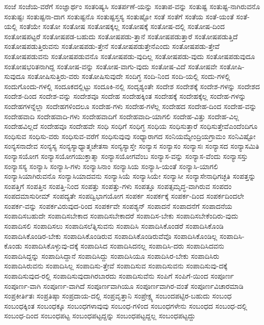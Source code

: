 {ಸಂಜೆ
ಸಂಜೆಯ-ವರೆಗೆ
ಸಂಜ್ಞಾರ್ಥಂ
ಸಂತರಿಷ್ಯಸಿ
ಸಂತರ್ಪಣೆ-ಯನ್ನು
ಸಂತಾಪ-ವನ್ನು
ಸಂತುಷ್ಟ
ಸಂತುಷ್ಟ-ನಾಗಿರುವನೊ
ಸಂತುಷ್ಟಃ
ಸಂತುಷ್ಟನಾ-ದಾಗ
ಸಂತುಷ್ಟನೊ
ಸಂತುಷ್ಟಸ್ತಸ್ಯ
ಸಂತುಷ್ಟೋ
ಸಂತೆ
ಸಂತೆಗೆ
ಸಂತೆಯ
ಸಂತೆ-ಯಂತೆ
ಸಂತೆ-ಯಲ್ಲಿ
ಸಂತೆಯೇ
ಸಂತೋ
ಸಂತೋಷ
ಸಂತೋಷಕ್ಕಲ್ಲ
ಸಂತೋಷಕ್ಕೆ
ಸಂತೋಷ-ದಲ್ಲಿ
ಸಂತೋಷ-ದಿಂದ
ಸಂತೋಷಪಟ್ಟರೆ
ಸಂತೋಷಪಡ-ಬಹುದು
ಸಂತೋಷಪಡು-ತ್ತಾನೆ
ಸಂತೋಷಪಡುತ್ತಾರೆ
ಸಂತೋಷಪಡುತ್ತಿದೆ
ಸಂತೋಷಪಡುತ್ತಿರುವನು
ಸಂತೋಷಪಡು-ತ್ತೇನೆ
ಸಂತೋಷಪಡುತ್ತೇನೆಎಂದು
ಸಂತೋಷಪಡು-ತ್ತೇವೆ
ಸಂತೋಷಪಡುವನು
ಸಂತೋಷಪಡುವನೊ
ಸಂತೋಷಪಡು-ವುದಿಲ್ಲ
ಸಂತೋಷಪಡು-ವುದು
ಸಂತೋಷಪಡುವುದೂ
ಸಂತೋಷಭರಿತನಾಗಿದ್ದ
ಸಂತೋಷ-ವನ್ನು
ಸಂತೋಷ-ವಾಗು-ವುದು
ಸಂತೋಷ-ವಿದೆ
ಸಂತೋಷವೇ
ಸಂತೋಷಿ-ಸುವುದೂ
ಸಂತೋಷಿಸುತ್ತಿರು-ವರು
ಸಂತೋಷಿಸುವುದೇ
ಸಂದಿಗ್ಧ
ಸಂದಿ-ನಿಂದ
ಸಂದಿ-ಯಲ್ಲಿ
ಸಂದು-ಗಳಲ್ಲಿ
ಸಂದುಗೊಂದು-ಗಳಲ್ಲಿ
ಸಂದೂಕದಲ್ಲಿಟ್ಟು
ಸಂದೂಕಿ-ನಲ್ಲಿ
ಸಂದೃಶ್ಯಂತೇ
ಸಂದೇಶ
ಸಂದೇಶಕ್ಕೆ
ಸಂದೇಶ-ಗಳನ್ನು
ಸಂದೇಶದ
ಸಂದೇಶ-ದಿಂದ
ಸಂದೇಶ-ವನ್ನು
ಸಂದೇಶವೂ
ಸಂದೇಹ
ಸಂದೇಹಕ್ಕಿಂತ
ಸಂದೇಹಕ್ಕೆ
ಸಂದೇಹಕ್ಕೆಲ್ಲ
ಸಂದೇಹ-ಗಳನ್ನು
ಸಂದೇಹಗಳನ್ನೆಲ್ಲಾ
ಸಂದೇಹಗಳಿಂದಲೂ
ಸಂದೇಹ-ಗಳು
ಸಂದೇಹ-ಗಳೆಲ್ಲ
ಸಂದೇಹದ
ಸಂದೇಹ-ದಿಂದ
ಸಂದೇಹ-ವನ್ನು
ಸಂದೇಹವಾದಿ
ಸಂದೇಹವಾದಿ-ಗಳು
ಸಂದೇಹವಾದಿಗೆ
ಸಂದೇಹವಾದಿ-ಯಾಗಲಿ
ಸಂದೇಹ-ವಿತ್ತು
ಸಂದೇಹ-ವಿಲ್ಲ
ಸಂದೇಹವಿಲ್ಲದೆ
ಸಂದೇಹವೂ
ಸಂದೇಹವೇ
ಸಂಧಿ
ಸಂಧಿಗೆ
ಸಂಧಿಗ್ಧ
ಸಂಧಿಯ
ಸಂಧಿಸುತ್ತಾರೆ
ಸಂಧಿಸುತ್ತೇವೆಎಂದೆಂದಿಗೂ
ಸಂಧಿಸುವ
ಸಂಧಿಸು-ವರು
ಸಂಧಿಸುವ-ವರೆಗೆ
ಸಂಧಿಸುವುವು
ಸಂಧ್ಯಾರಾಗದ
ಸಂನಿಯಮ್ಯೇಂದ್ರಿಯಗ್ರಾಮಂ
ಸಂನಿವಿಷ್ಟೋ
ಸಂನ್ಯಸನಾದೇವ
ಸಂನ್ಯಸ್ಯ
ಸಂನ್ಯಸ್ಯಾಧ್ಯಾತ್ಮಚೇತಸಾ
ಸಂನ್ಯಸ್ಯಾಸ್ತೇ
ಸಂನ್ಯಾಸ
ಸಂನ್ಯಾಸಂ
ಸಂನ್ಯಾಸಃ
ಸಂನ್ಯಾಸದ
ಸಂನ್ಯಾಸಮಿತಿ
ಸಂನ್ಯಾಸಯೋಗ
ಸಂನ್ಯಾಸಯೋಗಯುಕ್ತಾತ್ಮಾ
ಸಂನ್ಯಾಸಯೋಗವೆಂಬ
ಸಂನ್ಯಾಸ-ವನ್ನು
ಸಂನ್ಯಾಸ-ವೆಂದು
ಸಂನ್ಯಾಸಸ್ತು
ಸಂನ್ಯಾಸಸ್ಯ
ಸಂನ್ಯಾಸಿ
ಸಂನ್ಯಾಸಿ-ಗಳು
ಸಂನ್ಯಾಸಿನಾಂ
ಸಂನ್ಯಾಸಿಯ
ಸಂನ್ಯಾಸಿ-ಯಂತೆ
ಸಂನ್ಯಾಸಿ-ಯಾಗಲಿ
ಸಂನ್ಯಾಸಿಯಾಗಿರುವನೊ
ಸಂನ್ಯಾಸಿಯಾದವನು
ಸಂನ್ಯಾಸಿಯೆ
ಸಂನ್ಯಾಸಿಯೇ
ಸಂನ್ಯಾಸೀ
ಸಂನ್ಯಾಸೇನಾಧಿಗಚ್ಛತಿ
ಸಂಪತ್ತನ್ನು
ಸಂಪತ್ತಿಗೆ
ಸಂಪತ್ತಿನ
ಸಂಪತ್ತಿ-ನಿಂದ
ಸಂಪತ್ತು
ಸಂಪತ್ತು-ಗಳು
ಸಂಪತ್ತೂ
ಸಂಪತ್ಸಮೃದ್ಧ-ವಾಗಿರುವ
ಸಂಪದಂ
ಸಂಪದಮಾಸುರೀಮ್
ಸಂಪದ್ಯತೇ
ಸಂಪದ್ವಿಭಾಗಯೋಗ
ಸಂಪರ್ಕ
ಸಂಪರ್ಕಕ್ಕೆ
ಸಂಪರ್ಕ-ದಿಂದ
ಸಂಪರ್ಕದಿಂದಲೇ
ಸಂಪರ್ಕ-ವನ್ನು
ಸಂಪರ್ಕವಿರುವುದ-ರಿಂದ
ಸಂಪರ್ಕವೇ
ಸಂಪಶ್ಯನ್
ಸಂಪಾದನೆ
ಸಂಪಾದನೆಗೆ
ಸಂಪಾದನೆಯ
ಸಂಪಾದಿಸಬಹುದೇ
ಸಂಪಾದಿಸಬೇಕಾದ
ಸಂಪಾದಿಸಬೇಕಾದರೆ
ಸಂಪಾದಿಸ-ಬೇಕು
ಸಂಪಾದಿಸಬೇಕೆಂದಿರು-ವುದು
ಸಂಪಾದಿಸಲಿ
ಸಂಪಾದಿಸಲು
ಸಂಪಾದಿಸಲೆತ್ನಿಸುವನು
ಸಂಪಾದಿಸಿ
ಸಂಪಾದಿಸಿಕೊಂಡರೆ
ಸಂಪಾದಿಸಿಕೊಂಡಿ
ಸಂಪಾದಿಸಿಕೊಂಡಿರ-ಬೇಕು
ಸಂಪಾದಿಸಿಕೊಂಡಿರುವ
ಸಂಪಾದಿಸಿಕೊಂಡಿರುವೆವೊ
ಸಂಪಾದಿಸಿಕೊಂಡಿಲ್ಲ
ಸಂಪಾದಿಸಿ-ಕೊಂಡು
ಸಂಪಾದಿಸಿಕೊಳ್ಳುವು-ದಕ್ಕೆ
ಸಂಪಾದಿಸಿದ
ಸಂಪಾದಿಸಿದನಲ್ಲ
ಸಂಪಾದಿಸಿ-ದರು
ಸಂಪಾದಿಸಿದವನು
ಸಂಪಾದಿಸಿದ್ದನ್ನು
ಸಂಪಾದಿಸಿದ್ದಾನೆ
ಸಂಪಾದಿಸಿದ್ದು
ಸಂಪಾದಿಸಿಯೂ
ಸಂಪಾದಿಸಿರ-ಬೇಕು
ಸಂಪಾದಿಸಿರು
ಸಂಪಾದಿಸಿರುವನು
ಸಂಪಾದಿಸಿಲ್ಲ
ಸಂಪಾದಿಸು-ತ್ತೇವೆ
ಸಂಪಾದಿಸುವ
ಸಂಪಾದಿಸುವನು
ಸಂಪಾದಿಸುವು-ದಕ್ಕೆ
ಸಂಪಾದಿಸುವುದ-ರಲ್ಲಿ
ಸಂಪಾದಿಸುವುದಾಗಿರಬಾರದು
ಸಂಪಾದಿಸುವೆನು
ಸಂಪಿಗೆ
ಸಂಪಿಗೆ-ಯಿಂದ
ಸಂಪೂರ್ಣ
ಸಂಪೂರ್ಣ-ವಾಗಿ
ಸಂಪೂರ್ಣ-ವಾಗಿದೆ
ಸಂಪೂರ್ಣವಾಗಿಯೂ
ಸಂಪೂರ್ಣವಾಗಿರ-ವಂತೆ
ಸಂಪೂರ್ಣವಿಚಾರಮಾಡಿ
ಸಂಪ್ರಕೀರ್ತಿತಃ
ಸಂಪ್ರತಿಷ್ಠಾ
ಸಂಪ್ರದಾಯ-ದಲ್ಲಿ
ಸಂಪ್ರವೃತ್ತಾನಿ
ಸಂಪ್ರೇಕ್ಷ್ಯ
ಸಂಬಂದಪಟ್ಟಿರ-ಬಹುದು
ಸಂಬಂಧ
ಸಂಬಂಧಕ್ಕಿಂತ
ಸಂಬಂಧಕ್ಕೂ
ಸಂಬಂಧಗಳಾವುವು
ಸಂಬಂಧ-ಗಳಿಂದ
ಸಂಬಂಧಗಳೇನು
ಸಂಬಂಧದ
ಸಂಬಂಧ-ದಲ್ಲಿ
ಸಂಬಂಧ-ದಿಂದ
ಸಂಬಂಧಪಟ್ಟ
ಸಂಬಂಧಪಟ್ಟದ್ದನ್ನು
ಸಂಬಂಧಪಟ್ಟದ್ದಲ್ಲ
ಸಂಬಂಧಪಟ್ಟದ್ದು
}
